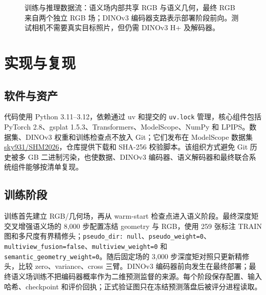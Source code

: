 \documentclass[UTF8,a4paper,11pt]{ctexart}
\begin{document}
\begin{figure}[t]
\centering
{}
\caption{训练与推理数据流：语义场内部共享 RGB 与语义几何，最终 RGB 来自两个独立 RGB 场；DINOv3 编码器支路表示部署阶段前向。测试相机不需要真实目标照片，但仍需 DINOv3 H+ 及解码器。}
\label{fig:pipeline}
\end{figure}

\section{实现与复现}
\subsection{软件与资产}
代码使用 Python 3.11--3.12，依赖通过 uv 和提交的 \texttt{uv.lock} 管理，核心组件包括 PyTorch 2.8、gsplat 1.5.3、Transformers、ModelScope、NumPy 和 LPIPS。数据集、DINOv3 权重和训练检查点不放入 Git；它们发布在 ModelScope 数据集\href{https://modelscope.cn/datasets/sky931/SHM2026/files}{sky931/SHM2026}，仓库提供下载和 SHA-256 校验脚本。该组织方式避免 Git 历史被多 GB 二进制污染，也使数据、DINOv3 编码器、语义解码器和最终联合系统组件能够按清单复现。

\subsection{训练阶段}
训练首先建立 RGB/几何场，再从 warm-start 检查点进入语义阶段。最终深度矩交叉增强语义场的 8,000 步配置冻结 geometry 与 RGB，使用 259 张标注 TRAIN 图和多尺度有界精修头；\texttt{pseudo\_dir: null}、\texttt{pseudo\_weight=0}、\texttt{multiview\_fusion=false}、\texttt{multiview\_weight=0} 和 \texttt{semantic\_geometry\_weight=0}。随后固定场的 3,000 步深度矩对照只更新精修头，比较 zero、variance、cross 三臂。DINOv3 编码器前向发生在最终部署；最终语义场训练不把编码器概率作为二维预测监督的来源。每个阶段保存配置、输入哈希、checkpoint 和评价回执；正式验证图只在冻结预测落盘后被评分进程读取。
\end{document}
